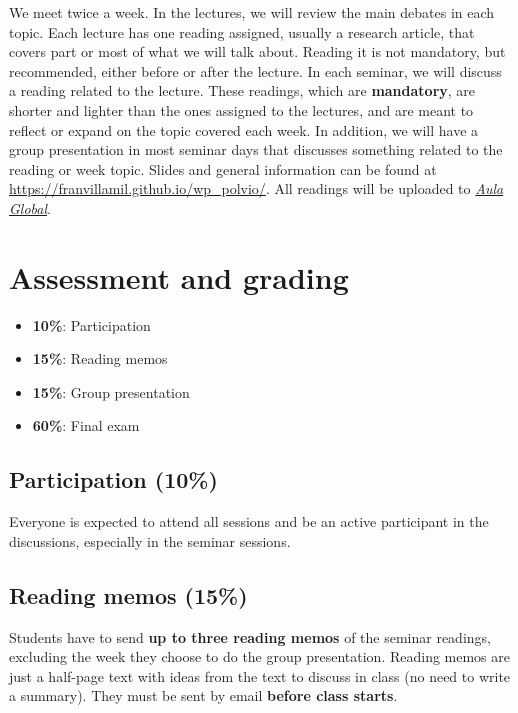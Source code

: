 \documentclass[12pt, a4paper]{article}
\begin{document}
We meet twice a week. In the lectures, we will review the main debates in each topic. Each lecture has one reading assigned, usually a research article, that covers part or most of what we will talk about. Reading it is not mandatory, but recommended, either before or after the lecture. In each seminar, we will discuss a reading related to the lecture. These readings, which are \textbf{mandatory}, are shorter and lighter than the ones assigned to the lectures, and are meant to reflect or expand on the topic covered each week. In addition, we will have a group presentation in most seminar days that discusses something related to the reading or week topic.
Slides and general information can be found at \href{https://franvillamil.github.io/wp_polvio/}{https://franvillamil.github.io/wp\_polvio/}. All readings will be uploaded to \href{https://aulaglobal.uc3m.es/}{\textit{Aula Global}}.

\section{Assessment and grading}

\begin{itemize}
\setlength\itemsep{0pt}
  \item \textbf{10\%}: Participation
  \item \textbf{15\%}: Reading memos
  \item \textbf{15\%}: Group presentation
  \item \textbf{60\%}: Final exam
\end{itemize}

\subsection*{Participation (10\%)}

Everyone is expected to attend all sessions and be an active participant in the discussions, especially in the seminar sessions.

\subsection*{Reading memos (15\%)}

Students have to send \textbf{up to three reading memos} of the seminar readings, excluding the week they choose to do the group presentation. Reading memos are just a half-page text with ideas from the text to discuss in class (no need to write a summary). They must be sent by email \textbf{before class starts}.
\end{document}
